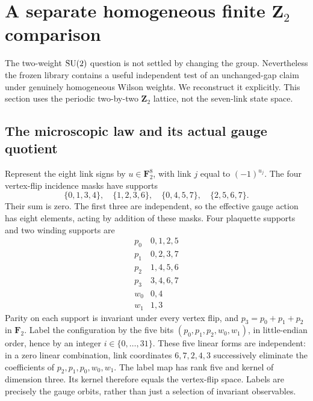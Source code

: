 \documentclass[11pt]{article}
\begin{document}
\section{A separate homogeneous finite $\mathbf Z_2$ comparison}
The two-weight $\mathrm{SU}(2)$ question is not settled by changing the group.
Nevertheless the frozen library contains a useful independent test of
an unchanged-gap claim under genuinely homogeneous Wilson weights.
We reconstruct it explicitly. This section uses the periodic two-by-two
$\mathbf Z_2$ lattice, not the seven-link state space.

\subsection*{The microscopic law and its actual gauge quotient}
Represent the eight link signs by $u\in\mathbf F_2^8$, with link $j$
equal to $(-1)^{u_j}$. The four vertex-flip incidence masks have supports
\[
 \{0,1,3,4\},\quad\{1,2,3,6\},\quad\{0,4,5,7\},
 \quad\{2,5,6,7\}.
\]
Their sum is zero. The first three are independent, so the effective
gauge action has eight elements, acting by addition of these masks.
Four plaquette supports and two winding supports are
\[
\begin{array}{c|l}
 p_0&0,1,2,5\\ p_1&0,2,3,7\\p_2&1,4,5,6\\p_3&3,4,6,7\\
 w_0&0,4\\w_1&1,3
\end{array}
\]
Parity on each support is invariant under every vertex flip, and
$p_3=p_0+p_1+p_2$ in $\mathbf F_2$. Label the configuration by
the five bits $(p_0,p_1,p_2,w_0,w_1)$, in little-endian order, hence
by an integer $i\in\{0,\ldots,31\}$. These five linear forms are
independent: in a zero linear combination, link coordinates $6,7,2,4,3$
successively eliminate the coefficients of $p_2,p_1,p_0,w_0,w_1$.
The label map has rank five and kernel of dimension three. Its kernel
therefore equals the vertex-flip space. Labels are precisely the gauge
orbits, rather than just a selection of invariant observables.
\end{document}
